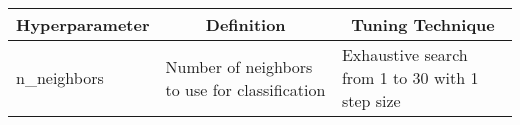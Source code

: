 \begin{table}[H]
\centering
\begin{tabularx}{0.8\textwidth}{l|X|X}
\hline
\textbf{Hyperparameter} & \multicolumn{1}{c|}{\textbf{Definition}}      & \multicolumn{1}{c}{\textbf{Tuning Technique}}  \\ \hline
n\_neighbors            & Number of neighbors to use for classification & Exhaustive search from 1 to 30 with 1 step size \\ \hline
\end{tabularx}
\end{table}